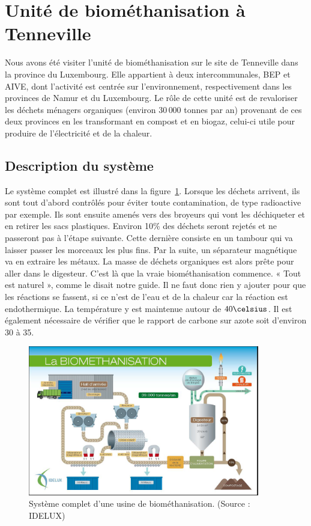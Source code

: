 \section{Unité de biométhanisation à Tenneville}

Nous avons été visiter l'unité de biométhanisation sur le site de Tenneville dans la
province du Luxembourg. Elle appartient à deux intercommunales, BEP et AIVE, dont
l'activité est centrée sur l'environnement, respectivement dans les provinces de Namur
et du Luxembourg. Le rôle de cette unité est de revaloriser les déchets ménagers
organiques (environ $30\,000$ tonnes par an) provenant de ces deux provinces en les
transformant en compost et en biogaz, celui-ci utile pour produire de l'électricité et de la
chaleur.

\subsection{Description du système}

Le système complet est illustré dans la figure~\ref{fig:biometh1}.
Lorsque les déchets arrivent, ils sont tout d'abord contrôlés pour éviter toute contamination, de type radioactive par exemple. Ils sont ensuite amenés vers des broyeurs qui vont les déchiqueter et en retirer les sacs plastiques. Environ 10\% des déchets seront rejetés et ne passeront pas à l'étape suivante. Cette dernière consiste en un tambour qui va laisser passer les morceaux les plus fins. Par la suite, un séparateur magnétique va en extraire les métaux. La masse de déchets organiques est alors prête pour aller dans le digesteur. C'est là que la vraie biométhanisation commence. « Tout est naturel », comme le disait notre guide. Il ne faut donc rien y ajouter pour que les réactions se fassent, si ce n'est de l'eau et de la chaleur car la réaction est endothermique. La température y est maintenue autour de $40\celsius$. Il est également nécessaire de vérifier que le rapport de carbone sur azote soit d'environ 30 à 35.

\begin{figure}
\centering
\includegraphics[width=0.9\textwidth]{img/biometh1}
\caption{Système complet d'une usine de biométhanisation. (Source : IDELUX)}
\label{fig:biometh1}
\end{figure}

